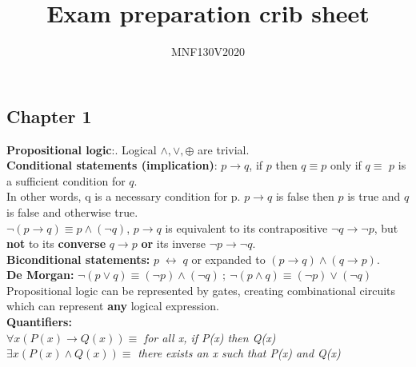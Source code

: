\documentclass[12pt]{article}
\title{\huge Exam preparation crib sheet}
\author{\LARGE MNF130V2020}
\renewcommand{\iff}{\;\leftrightarrow\;}
\begin{document}
\maketitle

\bigskip

\newpage

\subsection{Chapter 1}
\smallskip
\textbf{Propositional logic}:. Logical $\wedge,\vee,\oplus$ are trivial. \\
\smallskip
\textbf{Conditional statements (implication)}: $p \rightarrow q$, if $p$ then $q \equiv p $ only if $q \equiv$ $p$ is a sufficient condition for $q$. \\
In other words, q is a necessary condition for p. $p \rightarrow q$ is false then $p$ is true and $q$ is false and otherwise true. \\
$\neg(p\rightarrow q)\equiv p \wedge (\neg q)$, $p \rightarrow q$ is equivalent to its contrapositive $\neg q \rightarrow \neg p$, but \textbf{not} to its \textbf{converse} $q \rightarrow p$ \textbf{or} its inverse $\neg p \rightarrow \neg q$. \\
\smallskip
\textbf{Biconditional statements:} $ p \iff q$ or expanded to $(p \rightarrow q) \wedge (q \rightarrow p)$. \\
\smallskip
\textbf{De Morgan:} $\neg(p \vee q) \equiv (\neg p) \wedge (\neg q)\ ;\ \neg(p \wedge q) \equiv (\neg p ) \vee (\neg q) $
\smallskip
Propositional logic can be represented by gates, creating combinational circuits which can represent \textbf{any} logical expression. \\
\medskip
\textbf{Quantifiers:} \\
$
\forall x(P(x) \rightarrow Q(x)) \equiv
$
\textit{for all x, if P(x) then Q(x)} \\
$
\exists x(P(x) \wedge Q(x)) \equiv
$
\textit{there exists an x such that P(x) and Q(x)} \\
\end{document}
